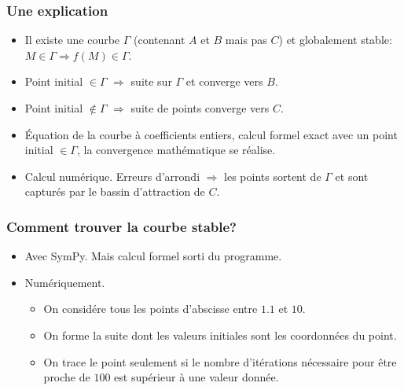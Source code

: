 \begin{frame}
  \frametitle{Une explication}
\begin{itemize}
  \item Il existe une courbe $\Gamma$ (contenant $A$ et $B$ mais pas $C$) et globalement stable: $M\in \Gamma \Rightarrow f(M)\in \Gamma$.
  \item Point initial $\in\Gamma$ $\Rightarrow$ suite sur $\Gamma$ et converge vers $B$.
  \item Point initial $\notin \Gamma$ $\Rightarrow$ suite de points converge vers $C$.
  \item \'Equation de la courbe à coefficients entiers, calcul formel exact avec un point initial $\in \Gamma$, la convergence mathématique se réalise.
  \item Calcul numérique. Erreurs d'arrondi $\Rightarrow$ les points sortent de $\Gamma$ et sont capturés par le bassin d'attraction de $C$.
\end{itemize}
\end{frame}

\begin{frame}
  \frametitle{Comment trouver la courbe stable?}
\begin{itemize}
  \item Avec SymPy. Mais calcul formel sorti du programme.
  \item Numériquement.
  \begin{itemize}
    \item On considére tous les points d'abscisse entre $1.1$ et $10$.
    \item On forme la suite dont les valeurs initiales sont les coordonnées du point.
    \item On trace le point seulement si le nombre d'itérations nécessaire pour être proche de $100$ est supérieur à une valeur donnée.
  \end{itemize}
\end{itemize}
\end{frame}



